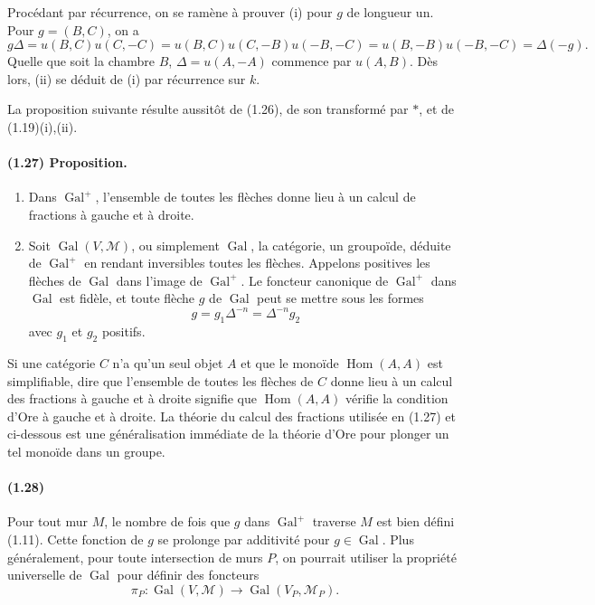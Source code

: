 \documentclass[10pt]{article}
\begin{document}
Procédant par récurrence, on se ramène à prouver (i) pour \(g\) de longueur un. Pour \(g=(B,C)\), on a
\[
g\Delta=u(B,C)u(C,-C)=u(B,C)u(C,-B)u(-B,-C)
=u(B,-B)u(-B,-C)=\Delta(-g).
\]
Quelle que soit la chambre \(B\), \(\Delta=u(A,-A)\) commence par \(u(A,B)\). Dès lors, (ii) se déduit de (i) par récurrence sur \(k\).

La proposition suivante résulte aussitôt de (1.26), de son transformé par \(*\), et de (1.19)(i),(ii).

\paragraph{(1.27) Proposition.}
\begin{enumerate}[label=(\roman*)]
\item Dans \(\operatorname{Gal}^+\), l'ensemble de toutes les flèches donne lieu à un calcul de fractions à gauche et à droite.
\item Soit \(\operatorname{Gal}(V,\mathcal M)\), ou simplement \(\operatorname{Gal}\), la catégorie, un groupoïde, déduite de \(\operatorname{Gal}^+\) en rendant inversibles toutes les flèches. Appelons positives les flèches de \(\operatorname{Gal}\) dans l'image de \(\operatorname{Gal}^+\). Le foncteur canonique de \(\operatorname{Gal}^+\) dans \(\operatorname{Gal}\) est fidèle, et toute flèche \(g\) de \(\operatorname{Gal}\) peut se mettre sous les formes
\[
g=g_1\Delta^{-n}=\Delta^{-n}g_2
\]
avec \(g_1\) et \(g_2\) positifs.
\end{enumerate}
Si une catégorie \(C\) n'a qu'un seul objet \(A\) et que le monoïde \(\operatorname{Hom}(A,A)\) est simplifiable, dire que l'ensemble de toutes les flèches de \(C\) donne lieu à un calcul des fractions à gauche et à droite signifie que \(\operatorname{Hom}(A,A)\) vérifie la condition d'Ore à gauche et à droite. La théorie du calcul des fractions utilisée en (1.27) et ci-dessous est une généralisation immédiate de la théorie d'Ore pour plonger un tel monoïde dans un groupe.

\paragraph{(1.28)} Pour tout mur \(M\), le nombre de fois que \(g\) dans \(\operatorname{Gal}^+\) traverse \(M\) est bien défini (1.11). Cette fonction de \(g\) se prolonge par additivité pour \(g\in\operatorname{Gal}\). Plus généralement, pour toute intersection de murs \(P\), on pourrait utiliser la propriété universelle de \(\operatorname{Gal}\) pour définir des foncteurs
\[
\pi_P:\operatorname{Gal}(V,\mathcal M)\longrightarrow \operatorname{Gal}(V_P,\mathcal M_P).
\]
\end{document}
